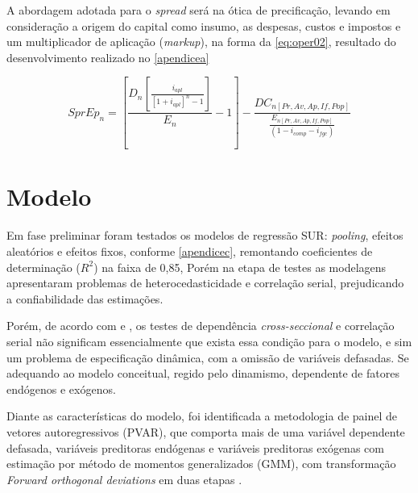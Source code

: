 \documentclass[
  12pt,
  12pt,
  openright,
  oneside,
  a4paper,
  chapter=TITLE,
  section=TITLE,
  subsection=TITLE,
  subsubsection=TITLE,
  english,
  portugues,
  sumario=tradicional]{abntex2}
\begin{document}
A abordagem adotada para o \emph{spread} será na ótica de precificação, levando em consideração a origem do capital como insumo, as despesas, custos e impostos e um multiplicador de aplicação (\emph{markup}), na forma da \autoref{eq:oper02}, resultado do desenvolvimento realizado no \autoref{apendicea}

\begin{equation}\label{eq:amor00}
SprEp_{n} =  [\frac{D_{n}[\frac{   i_{apl}  }{  [1 + i_{apl}]^n -1  }]}{E_{n}} -1] - \frac{DC_{n[Pr,Av,Ap,If,Pop]}}{\frac{E_{n[Pr,Av,Ap,If,Pop]}}{(1 - i_{comp} - i_{fgc})}}
\end{equation}

\section{Modelo}

Em fase preliminar foram testados os modelos de regressão SUR: \emph{pooling}, efeitos aleatórios e efeitos fixos, conforme \autoref{apendicec}, remontando coeficientes de determinação (\(R^2\)) na faixa de 0,85, Porém na etapa de testes as modelagens apresentaram problemas de heterocedasticidade e correlação serial, prejudicando a confiabilidade das estimações.

Porém, de acordo com \textcite{sargan:1964} e \textcite{hendry:1978}, os testes de dependência \emph{cross-seccional} e correlação serial não significam essencialmente que exista essa condição para o modelo, e sim um problema de especificação dinâmica, com a omissão de variáveis defasadas. Se adequando ao modelo conceitual, regido pelo dinamismo, dependente de fatores endógenos e exógenos.

Diante as características do modelo, foi identificada a metodologia de painel de vetores autoregressivos (PVAR), que comporta mais de uma variável dependente defasada, variáveis preditoras endógenas e variáveis preditoras exógenas com estimação por método de momentos generalizados (GMM), com transformação \emph{Forward orthogonal deviations} em duas etapas \cite{sigmund:2008}.
\end{document}
